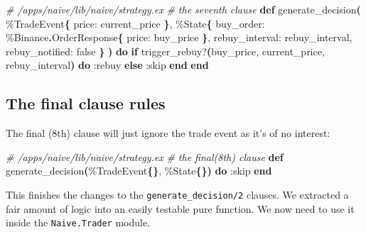 \documentclass[
  oneside]{book}
\newenvironment{Shaded}{\begin{snugshade}}{\end{snugshade}}
\newcommand{\CommentTok}[1]{\textcolor[rgb]{0.56,0.35,0.01}{\textit{#1}}}
\newcommand{\ConstantTok}[1]{\textcolor[rgb]{0.56,0.35,0.01}{#1}}
\newcommand{\ControlFlowTok}[1]{\textcolor[rgb]{0.13,0.29,0.53}{\textbf{#1}}}
\newcommand{\FunctionTok}[1]{\textcolor[rgb]{0.13,0.29,0.53}{\textbf{#1}}}
\newcommand{\KeywordTok}[1]{\textcolor[rgb]{0.13,0.29,0.53}{\textbf{#1}}}
\newcommand{\NormalTok}[1]{#1}
\newcommand{\OperatorTok}[1]{\textcolor[rgb]{0.81,0.36,0.00}{\textbf{#1}}}
\newcommand{\VariableTok}[1]{\textcolor[rgb]{0.00,0.00,0.00}{#1}}
\begin{document}
\begin{Shaded}
\begin{Highlighting}[]
\CommentTok{\# /apps/naive/lib/naive/strategy.ex}
\CommentTok{\# the seventh clause}
  \KeywordTok{def}\NormalTok{ generate\_decision}\FunctionTok{(}
\NormalTok{        \%}\ConstantTok{TradeEvent}\FunctionTok{\{}
          \VariableTok{price:}\NormalTok{ current\_price}
        \FunctionTok{\}}\NormalTok{,}
\NormalTok{        \%}\ConstantTok{State}\FunctionTok{\{}
          \VariableTok{buy\_order:}\NormalTok{ \%}\ConstantTok{Binance}\OperatorTok{.}\ConstantTok{OrderResponse}\FunctionTok{\{}
            \VariableTok{price:}\NormalTok{ buy\_price}
          \FunctionTok{\}}\NormalTok{,}
          \VariableTok{rebuy\_interval:}\NormalTok{ rebuy\_interval,}
          \VariableTok{rebuy\_notified:} \ConstantTok{false}
        \FunctionTok{\}}
      \FunctionTok{)} \KeywordTok{do}
    \ControlFlowTok{if}\NormalTok{ trigger\_rebuy?}\FunctionTok{(}\NormalTok{buy\_price, current\_price, rebuy\_interval}\FunctionTok{)} \KeywordTok{do}
      \VariableTok{:rebuy}
    \ControlFlowTok{else}
      \VariableTok{:skip}
    \KeywordTok{end}
  \KeywordTok{end}
\end{Highlighting}
\end{Shaded}

\newpage

\subsection{The final clause rules}\label{the-final-clause-rules}

The final (8th) clause will just ignore the trade event as it's of no interest:

\begin{Shaded}
\begin{Highlighting}[]
\CommentTok{\# /apps/naive/lib/naive/strategy.ex}
\CommentTok{\# the final(8th) clause}
  \KeywordTok{def}\NormalTok{ generate\_decision}\FunctionTok{(}\NormalTok{\%}\ConstantTok{TradeEvent}\FunctionTok{\{\}}\NormalTok{, \%}\ConstantTok{State}\FunctionTok{\{\})} \KeywordTok{do}
    \VariableTok{:skip}
  \KeywordTok{end}
\end{Highlighting}
\end{Shaded}

This finishes the changes to the \texttt{generate\_decision/2} clauses. We extracted a fair amount of logic into an easily testable pure function. We now need to use it inside the \texttt{Naive.Trader} module.
\end{document}
